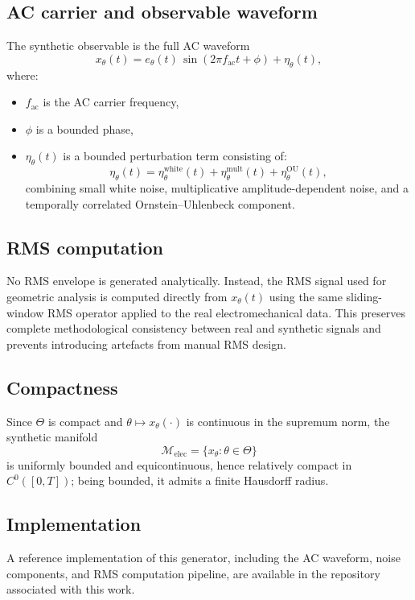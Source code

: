 \documentclass[10pt]{article}
\theoremstyle{plain}
\theoremstyle{definition}
\theoremstyle{remark}
\begin{document}
\subsection{AC carrier and observable waveform}

The synthetic observable is the full AC waveform
\[
x_\theta(t)
  = e_\theta(t)\,\sin(2\pi f_{\mathrm{ac}} t + \phi)
    + \eta_\theta(t),
\]
where:
\begin{itemize}
\item $f_{\mathrm{ac}}$ is the AC carrier frequency,
\item $\phi$ is a bounded phase,
\item $\eta_\theta(t)$ is a bounded perturbation term consisting of:
  \[
  \eta_\theta(t)
    = \eta^{\mathrm{white}}_\theta(t)
    + \eta^{\mathrm{mult}}_\theta(t)
    + \eta^{\mathrm{OU}}_\theta(t),
  \]
  combining small white noise, multiplicative amplitude-dependent noise,  
  and a temporally correlated Ornstein–Uhlenbeck component.
\end{itemize}

\subsection{RMS computation}

No RMS envelope is generated analytically.  
Instead, the RMS signal used for geometric analysis is computed directly from 
$x_\theta(t)$ using the same sliding-window RMS operator applied to the 
real electromechanical data.  
This preserves complete methodological consistency between real and synthetic 
signals and prevents introducing artefacts from manual RMS design.

\subsection{Compactness}

Since $\Theta$ is compact and $\theta \mapsto x_\theta(\cdot)$ is continuous in 
the supremum norm, the synthetic manifold
\[
\mathcal{M}_{\mathrm{elec}}
 = \{ x_\theta : \theta \in \Theta \}
\]
is uniformly bounded and equicontinuous, hence relatively compact in
$C^0([0,T])$; being bounded, it admits a finite Hausdorff radius.

\subsection*{Implementation} 

A reference implementation of this generator, including the AC waveform, noise 
components, and RMS computation pipeline, are available in the repository
associated with this work.
\end{document}

